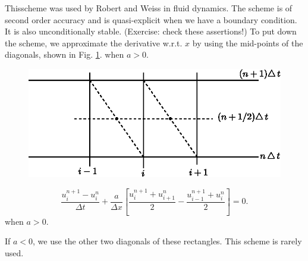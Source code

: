 \begin{exam}\label{chap8:exam8.7}
This\pageoriginale scheme was used by Robert and Weiss \cite{key34} in
fluid dynamics. The scheme is of second order accuracy and is
quasi-explicit when we have a boundary condition. It is also
unconditionally stable. (Exercise: check these assertions!) To put
down the scheme, we approximate the derivative w.r.t. $x$ by using the
mid-points of the diagonals, shown in Fig. \ref{c8:fig8.5}. when $a>0$. 

\begin{figure}[H]
\centering
\includegraphics{figures/fig52-8.5.eps}
\caption{}\label{c8:fig8.5}
\end{figure}
\begin{equation*}
\frac{u^{n+1}_i - u^n_i}{\Delta t} + \frac{a}{\Delta x} \left[\frac{u^{n+1}_i + u^n_{i+1}}{2} - \frac{u^{n+1}_{i-1} + u^n_i}{2} \right] = 0.\tag{8.19}\label{eq8.19}
\end{equation*}
when $a>0$.

If $a<0$, we use the other two diagonals of these rectangles. This scheme is rarely used.
\end{exam}

